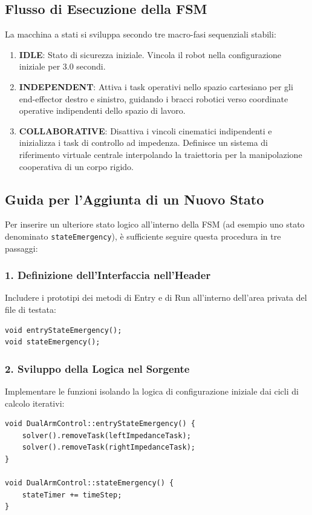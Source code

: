 \documentclass[11pt,a4paper]{article}
\begin{document}
\subsection{Flusso di Esecuzione della FSM}
La macchina a stati si sviluppa secondo tre macro-fasi sequenziali stabili:
\begin{enumerate}
    \item \textbf{IDLE}: Stato di sicurezza iniziale. Vincola il robot nella configurazione iniziale per 3.0 secondi.
    \item \textbf{INDEPENDENT}: Attiva i task operativi nello spazio cartesiano per gli end-effector destro e sinistro, guidando i bracci robotici verso coordinate operative indipendenti dello spazio di lavoro.
    \item \textbf{COLLABORATIVE}: Disattiva i vincoli cinematici indipendenti e inizializza i task di controllo ad impedenza. Definisce un sistema di riferimento virtuale centrale interpolando la traiettoria per la manipolazione cooperativa di un corpo rigido.
\end{enumerate}

\subsection{Guida per l'Aggiunta di un Nuovo Stato}
Per inserire un ulteriore stato logico all'interno della FSM (ad esempio uno stato denominato \texttt{stateEmergency}), è sufficiente seguire questa procedura in tre passaggi:

\subsubsection*{1. Definizione dell'Interfaccia nell'Header}
Includere i prototipi dei metodi di Entry e di Run all'interno dell'area privata del file di testata:
\begin{lstlisting}
void entryStateEmergency();
void stateEmergency();
\end{lstlisting}

\subsubsection*{2. Sviluppo della Logica nel Sorgente}
Implementare le funzioni isolando la logica di configurazione iniziale dai cicli di calcolo iterativi:
\begin{lstlisting}
void DualArmControl::entryStateEmergency() {
    solver().removeTask(leftImpedanceTask);
    solver().removeTask(rightImpedanceTask);
}

void DualArmControl::stateEmergency() {
    stateTimer += timeStep;
}
\end{lstlisting}
\end{document}

